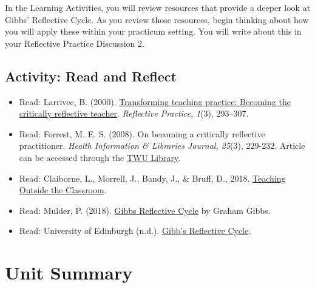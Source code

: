\documentclass[
]{book}
\providecommand{\tightlist}{%
  \setlength{\itemsep}{0pt}\setlength{\parskip}{0pt}}
\begin{document}
In the Learning Activities, you will review resources that provide a deeper look at Gibbs' Reflective Cycle. As you review those resources, begin thinking about how you will apply these within your practicum setting. You will write about this in your Reflective Practice Discussion 2.

\hypertarget{activity-read-and-reflect-1}{%
\subsection*{Activity: Read and Reflect}\label{activity-read-and-reflect-1}}

\begin{reflect}
\begin{itemize}
\tightlist
\item
  Read: Larrivee, B. (2000). \href{http://ed253jcu.pbworks.com/w/page/f/Larrivee_B_2000CriticallyReflectiveTeacher.pdf}{Transforming teaching practice: Becoming the critically reflective teacher}. \emph{Reflective Practice,} \emph{1}(3), 293--307.\\
\item
  Read: Forrest, M. E. S. (2008). On becoming a critically reflective practitioner. \emph{Health Information \& Libraries Journal, 25}(3), 229-232. Article can be accessed through the \href{https://www.twu.ca/library/}{TWU Library}.\\
\item
  Read: Claiborne, L., Morrell, J., Bandy, J., \& Bruff, D., 2018. \href{https://cft.vanderbilt.edu/guides-sub-pages/teaching-outside-the-classroom}{Teaching Outside the Classroom}.\\
\item
  Read: Mulder, P. (2018). \href{https://www.toolshero.com/management/gibbs-reflective-cycle-graham-gibbs/}{Gibbs Reflective Cycle} by Graham Gibbs.\\
\item
  Read: University of Edinburgh (n.d.). \href{https://www.ed.ac.uk/reflection/reflectors-toolkit/reflecting-on-experience/gibbs-reflective-cycle}{Gibb's Reflective Cycle}.
\end{itemize}
\end{reflect}

\hypertarget{unit-summary}{%
\section*{Unit Summary}\label{unit-summary}}
\end{document}
